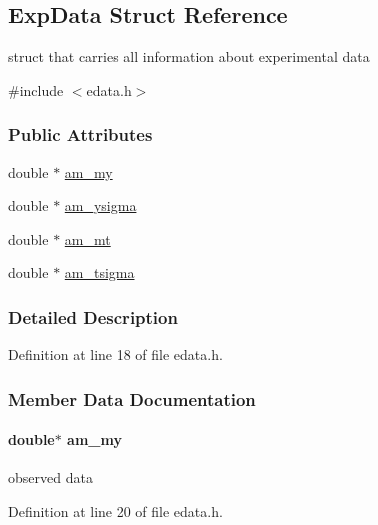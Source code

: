 \hypertarget{struct_exp_data}{}\subsection{Exp\+Data Struct Reference}
\label{struct_exp_data}


struct that carries all information about experimental data  




{\ttfamily \#include $<$edata.\+h$>$}

\subsubsection*{Public Attributes}
\begin{DoxyCompactItemize}
\item 
double $\ast$ \hyperlink{struct_exp_data_a1853cfbbd72291b3c37df42b7f07d513}{am\+\_\+my}
\item 
double $\ast$ \hyperlink{struct_exp_data_af29a27d415ab3b3f165e86473412baad}{am\+\_\+ysigma}
\item 
double $\ast$ \hyperlink{struct_exp_data_a44a8bb7cd806b8892c6ebff4d0bc75d4}{am\+\_\+mt}
\item 
double $\ast$ \hyperlink{struct_exp_data_a4d3759d9bc2651d74857d8801f8600cf}{am\+\_\+tsigma}
\end{DoxyCompactItemize}


\subsubsection{Detailed Description}


Definition at line 18 of file edata.\+h.



\subsubsection{Member Data Documentation}
\hypertarget{struct_exp_data_a1853cfbbd72291b3c37df42b7f07d513}{}
\paragraph[{am\+\_\+my}]{\setlength{\rightskip}{0pt plus 5cm}double$\ast$ am\+\_\+my}\label{struct_exp_data_a1853cfbbd72291b3c37df42b7f07d513}
observed data 

Definition at line 20 of file edata.\+h.

